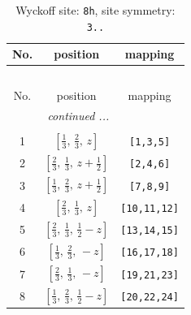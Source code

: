 \documentclass[fleqn,8pt]{jsarticle}
\begin{document}
\begin{longtable}{ccc}
\caption{Wyckoff site: {\tt 8h}, site symmetry: {\tt 3..}}
 \\
 \hline \hline
No. & position & mapping \\ \hline \endfirsthead

\multicolumn{2}{l}{\tablename\ \thetable{}} \\
 \hline \hline
No. & position & mapping \\ \hline \endhead

 \hline \hline
\multicolumn{2}{r}{\footnotesize\it continued ...} \\ \endfoot

 \hline \hline
\multicolumn{2}{r}{} \\ \endlastfoot

1 & $\left[ \frac{1}{3},\, \frac{2}{3},\, z \right]$ & {\tt [1,3,5]} \\ \hline
2 & $\left[ \frac{2}{3},\, \frac{1}{3},\, z + \frac{1}{2} \right]$ & {\tt [2,4,6]} \\ \hline
3 & $\left[ \frac{1}{3},\, \frac{2}{3},\, z + \frac{1}{2} \right]$ & {\tt [7,8,9]} \\ \hline
4 & $\left[ \frac{2}{3},\, \frac{1}{3},\, z \right]$ & {\tt [10,11,12]} \\ \hline
5 & $\left[ \frac{2}{3},\, \frac{1}{3},\, \frac{1}{2} - z \right]$ & {\tt [13,14,15]} \\ \hline
6 & $\left[ \frac{1}{3},\, \frac{2}{3},\, - z \right]$ & {\tt [16,17,18]} \\ \hline
7 & $\left[ \frac{2}{3},\, \frac{1}{3},\, - z \right]$ & {\tt [19,21,23]} \\ \hline
8 & $\left[ \frac{1}{3},\, \frac{2}{3},\, \frac{1}{2} - z \right]$ & {\tt [20,22,24]} \\
\end{longtable}
\renewcommand{\arraystretch}{1.2}
\end{document}
